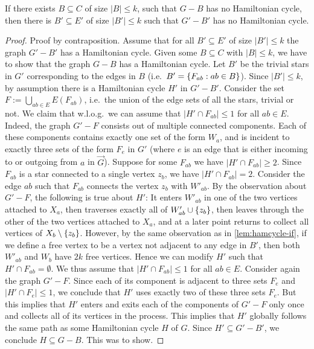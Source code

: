\begin{lemma}
\label{lem:hamcycle-only-if}
    If there exists $B \subseteq C$ of size $|B| \leq k$, such that $G - B$ has no Hamiltonian cycle, then there is $B' \subseteq E'$ of size $|B'| \leq k$ such that $G' - B'$ has no Hamiltonian cycle.
\end{lemma}
\begin{proof}
    Proof by contraposition. Assume that for all $B' \subseteq E'$ of size $|B'| \leq k$ the graph $G' - B'$ has a Hamiltonian cycle. 
    Given some $B \subseteq C$ with $|B| \leq k$, we have to show that the graph $G - B$ has a Hamiltonian cycle. 
    Let $B'$ be the trivial stars in $G'$ corresponding to the edges in $B$ (i.e.\ $B' = \{ F_{ab} : ab \in B \}$). 
    Since $|B'| \leq k$, by assumption there is a Hamiltonian cycle $H'$ in $G' - B'$.  
    Consider the set $F := \bigcup_{ab \in E}E(F_{ab})$, i.e.\ the union of the edge sets of all the stars, trivial or not.
    We claim that w.l.o.g.\ we can assume that $|H' \cap F_{ab}| \leq 1$ for all $ab \in E$.
    Indeed, the graph $G' - F$ consists out of multiple connected components. 
    Each of these components contains exactly one set of the form $W_a$, and is incident to exactly three sets of the form $F_e$ in $G'$ (where $e$ is an edge that is either incoming to or outgoing from $a$ in $\overrightarrow{G}$).
    Suppose for some $F_{ab}$ we have $|H' \cap F_{ab}| \geq 2$.
    Since $F_{ab}$ is a star connected to a single vertex $z_b$, we have $|H' \cap F_{ab}| = 2$.
    Consider the edge $ab$ such that $F_{ab}$ connects the vertex $z_b$ with $W'_{ab}$. 
    By the observation about $G' - F$, the following is true about $H'$: 
    It enters $W'_{ab}$ in one of the two vertices attached to $X_a$, then traverses exactly all of $W'_{ab} \cup \{ z_b \}$, 
    then leaves through the other of the two vertices attached to $X_a$, and at a later point returns to collect all vertices of $X_b \setminus \{ z_b \}$.
    However, by the same observation as in \cref{lem:hamcycle-if}, if we define a free vertex to be a vertex not adjacent to any edge in $B'$, then both $W'_{ab}$ and $W_b$ have $2k$ free vertices.
    Hence we can modify $H'$ such that $H' \cap F_{ab} = \emptyset$.
    We thus assume that $|H' \cap F_{ab}| \leq 1$ for all $ab \in E$.
    Consider again the graph $G' - F$.
    Since each of its component is adjacent to three sets $F_e$ and $|H' \cap F_e| \leq 1$, we conclude that $H'$ uses exactly two of these three sets $F_e$.
    But this implies that $H'$ enters and exits each of the components of $G'- F$ only once and collects all of its vertices in the process.
    This implies that $H'$ globally follows the same path as some Hamiltonian cycle $H$ of $G$.
    Since $H' \subseteq G' - B'$, we conclude $H \subseteq G - B$.
    This was to show.
\end{proof}


